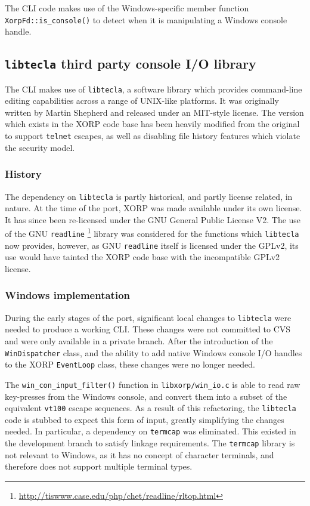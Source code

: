 \documentclass[11pt]{article}
\begin{document}
{The CLI code makes use of the Windows-specific member function
{\tt XorpFd::is\_console()}
to detect when it is manipulating a Windows console handle.

\subsection{{\tt libtecla} third party console I/O library}

The CLI makes use of {\tt libtecla}, a software library
which provides command-line editing capabilities across a range of UNIX-like
platforms.
It was originally written by Martin Shepherd and released under
an MIT-style license.
The version which exists in the XORP code base has been
heavily modified from the original to support {\tt telnet} escapes, as well as
disabling file history features which violate the security model.

\subsubsection{History}

The dependency on {\tt libtecla} is partly historical, and partly
license related, in nature. At the time of the port, XORP was made
available under its own license. It has since been re-licensed under
the GNU General Public License V2. The use of the GNU {\tt readline}
\footnote{\url{http://tiswww.case.edu/php/chet/readline/rltop.html}}
library was considered for the functions which {\tt libtecla} now provides, however,
as GNU {\tt readline} itself is licensed under the GPLv2, its use would have
tainted the XORP code base with the incompatible GPLv2 license.

\subsubsection{Windows implementation}

During the early stages of the port, significant local changes to
{\tt libtecla} were needed to produce a working CLI. These changes were
not committed to CVS and were only available in a private branch.
After the introduction of the {\tt WinDispatcher} class, and the
ability to add native Windows console I/O handles to the XORP {\tt EventLoop}
class, these changes were no longer needed.

The {\tt win\_con\_input\_filter()}
function in {\tt libxorp/win\_io.c} is able to read raw key-presses from
the Windows console, and convert them into a subset of the equivalent
{\tt vt100} escape sequences.
As a result of this refactoring, the {\tt libtecla} code is stubbed to
expect this form of input, greatly
simplifying the changes needed. In
particular, a dependency on {\tt termcap} was eliminated. This existed in the
development branch to satisfy linkage requirements.  The {\tt termcap}
library is not relevant to Windows, as it has no concept of character terminals,
and therefore does not support multiple terminal types.

}
\end{document}

